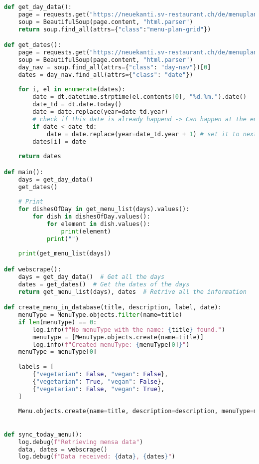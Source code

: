 \begin{lstlisting}[language=Python]
def get_day_data():
    page = requests.get("https://neuekanti.sv-restaurant.ch/de/menuplan/")
    soup = BeautifulSoup(page.content, "html.parser")
    return soup.find_all(attrs={"class":"menu-plan-grid"})

def get_dates():
    page = requests.get("https://neuekanti.sv-restaurant.ch/de/menuplan/")
    soup = BeautifulSoup(page.content, "html.parser")
    day_nav = soup.find_all(attrs={"class": "day-nav"})[0]
    dates = day_nav.find_all(attrs={"class": "date"})
    
    for i, el in enumerate(dates):
        date = dt.datetime.strptime(el.contents[0], "%d.%m.").date()
        date_td = dt.date.today()
        date = date.replace(year=date_td.year)
        # check if this date is already happend -> Can happen at the end of the year
        if date < date_td:
            date = date.replace(year=date_td.year + 1) # set it to next year
        dates[i] = date
    
    return dates

def main():
    days = get_day_data()
    get_dates()
    
    # Print
    for dishesOfDay in get_menu_list(days).values():
        for dish in dishesOfDay.values():
            for element in dish.values():
                print(element)
            print("")
    
    print(get_menu_list(days))

def webscrape():
    days = get_day_data()  # Get all the days
    dates = get_dates()  # Get the dates of the days
    return get_menu_list(days), dates  # Retrive all the information

def create_menu_in_database(title, description, label, date):
    menuType = MenuType.objects.filter(name=title)
    if len(menuType) == 0:
        log.info(f"No menuType with the name: {title} found.")
        menuType = [MenuType.objects.create(name=title)]
        log.info(f"Created menuType: {menuType[0]}")
    menuType = menuType[0]
    
    labels = [
        {"vegetarian": False, "vegan": False},
        {"vegetarian": True, "vegan": False},
        {"vegetarian": False, "vegan": True},
    ]
    
    Menu.objects.create(name=title, description=description, menuType=menuType, date=date, **labels[label])
    

def sync_today_menu():
    log.debug(f"Retrieving mensa data")
    data, dates = webscrape()
    log.debug(f"Data received: {data}, {dates}")


\end{lstlisting}
